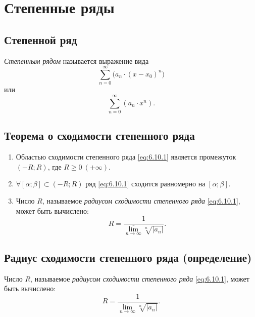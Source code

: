 \section{Степенные ряды}

\setcounter{subsection}{61}

\subsection{Степенной ряд}

\begin{definition}
    \emph{Степенным рядом} называется выражение вида
    \[
        \sum_{n=0}^{\infty}\big(a_n\cdot (x-x_0)^n\big)
    \]
    или
    \begin{equation}\label{eq:6.10.1}
        \sum_{n=0}^{\infty}(a_n \cdot x^n).
    \end{equation}
\end{definition}

\subsection{Теорема о сходимости степенного ряда}

\begin{theorem}\label{theorem:6.10.1}\leavevmode
    \begin{enumerate}
        \item Областью сходимости степенного ряда \ref{eq:6.10.1} является промежуток $(-R;R)$, где $R \geqslant 0 \ (+ \infty)$.
        \item $\forall [\alpha;\beta] \subset (-R;R)$ ряд \ref{eq:6.10.1} сходится равномерно на $[\alpha;\beta]$.
        \item Число $R$, называемое \emph{радиусом сходимости степенного ряда} \ref{eq:6.10.1}, может быть вычислено:
              \[
                  R = \frac{1}{\underset{n\rightarrow\infty}{\overline{\lim}}\sqrt[n]{|a_n|}}.
              \]
    \end{enumerate}
\end{theorem}

\subsection{Радиус сходимости степенного ряда (определение)}

\begin{definition}
    Число $R$, называемое \emph{радиусом сходимости степенного ряда} \ref{eq:6.10.1}, может быть вычислено:
    \[
        R = \frac{1}{\underset{n\rightarrow\infty}{\overline{\lim}}\sqrt[n]{|a_n|}}.
    \]
\end{definition}

